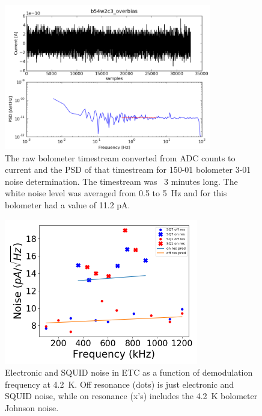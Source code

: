 \begin{figure}[ht!]
\begin{center}
\includegraphics[height=2.5in]{figures/b54w2c3_overbias.png}
\caption{The raw bolometer timestream converted from \ac{ADC} counts to current and the PSD of that timestream for 150-01 bolometer 3-01 noise determination. The timestream was ~3 minutes long. The white noise level was averaged from 0.5 to 5~Hz and for this bolometer had a value of 11.2 pA.
\label{fig:timestream_and_psd} }
\end{center}
\end{figure}

\begin{figure}[ht!]
\begin{center}
\includegraphics[height=2.5in]{figures/squid_plus_electronic_noise.png}
\caption{Electronic and \ac{SQUID} noise in \ac{ETC} as a function of demodulation frequency at 4.2~K. Off resonance (dots) is just electronic and \ac{SQUID} noise, while on resonance (x's) includes the 4.2~K bolometer Johnson noise. 
\label{fig:dark_squid_noise} }
\end{center}
\end{figure}

